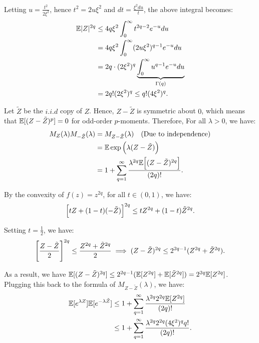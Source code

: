 \begin{proof*}
\begin{enumerate}[label=(\roman*)]
	    \noindent Letting $u=\frac{t^2}{2\xi^2}$, hence $t^2 = 2u\xi^2$ and $dt = \frac{\xi^2du}{t}$, the above integral becomes:
	    \begin{align*}
	        \mathbb{E}|Z|^{2q} &\le 4q\xi^2\int_0^\infty t^{2q-2}e^{-u}du \\
	            &= 4q\xi^2\int_{0}^\infty (2u\xi^2)^{q-1}e^{-u}du \\
	            &= 2q\cdot(2\xi^2)^q \underbrace{\int_0^\infty u^{q-1}e^{-u}du}_{\Gamma(q)} \\
	            &= 2q!(2\xi^2)^q \le q!(4\xi^2)^q.
	    \end{align*}

	    \noindent Let $\tilde Z$ be the $i.i.d$ copy of $Z$. Hence, $Z-\tilde Z$ is symmetric about $0$, which means that $\mathbb{E}[(Z-\tilde Z)^p] = 0$ for odd-order $p$-moments. Therefore, For all $\lambda>0$, we have:
	    \begin{align*}
	        M_Z(\lambda)M_{-\tilde Z}(\lambda) &= M_{Z-\tilde Z}(\lambda) \quad (\text{Due to independence})\\
	            &= \mathbb{E}\exp\Big( \lambda(Z - \tilde Z) \Big) \\
	            &= 1 + \sum_{q=1}^\infty \frac{\lambda^{2q}\mathbb{E}\Big[ (Z - \tilde Z)^{2q} \Big]}{(2q)!}.
	    \end{align*}

	    \noindent By the convexity of $f(z) = z^{2q}$, for all $t\in(0,1)$, we have:
	    \begin{align*}
	        \Big[ tZ + (1-t)(-\tilde Z) \Big]^{2q} \le tZ^{2q} + (1-t)\tilde Z^{2q}.
	    \end{align*}

	    \noindent Setting $t=\frac{1}{2}$, we have:
	    \begin{align*}
	        \Bigg[ \frac{Z - \tilde Z}{2} \Bigg]^{2q} \le \frac{Z^{2q} + \tilde Z^{2q}}{2} \implies (Z - \tilde Z)^{2q} \le 2^{2q-1}(Z^{2q} + \tilde Z^{2q}).
	    \end{align*}

	    \noindent As a result, we have $\mathbb{E}[(Z-\tilde Z)^{2q}] \le 2^{2q-1}(\mathbb{E}[Z^{2q}] + \mathbb{E}[\tilde Z^{2q}]) = 2^{2q}\mathbb{E}[Z^{2q}]$. Plugging this back to the formula of $M_{Z-\tilde Z}(\lambda)$, we have:
	    \begin{align*}
	        \mathbb{E}[e^{\lambda Z}]\mathbb{E}[e^{-\lambda \tilde Z}] &\le 1 + \sum_{q=1}^\infty \frac{\lambda^{2q}2^{2q}\mathbb{E}[Z^{2q}]}{(2q)!} \\
	        &\le 1 + \sum_{q=1}^\infty \frac{\lambda^{2q}2^{2q}(4\xi^2)^{q}q!}{(2q)!}.
	    \end{align*}


\end{enumerate}
\end{proof*}

